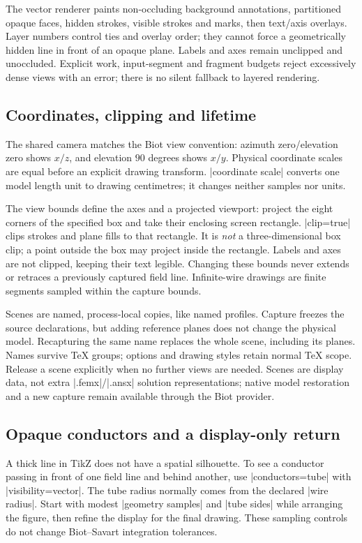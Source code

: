 The vector renderer paints non-occluding background annotations, partitioned
opaque faces, hidden strokes, visible strokes and marks, then text/axis overlays.
Layer numbers control ties and overlay order; they cannot force a geometrically
hidden line in front of an opaque plane. Labels and axes remain unclipped and
unoccluded. Explicit work, input-segment and fragment budgets reject excessively
dense views with an error; there is no silent fallback to layered rendering.

\subsection{Coordinates, clipping and lifetime}
The shared camera matches the Biot view convention: azimuth zero/elevation zero
shows $x/z$, and elevation $90$ degrees shows $x/y$. Physical coordinate scales
are equal before an explicit drawing transform. |coordinate scale| converts one
model length unit to drawing centimetres; it changes neither samples nor units.

The view bounds define the axes and a projected viewport: project the eight
corners of the specified box and take their enclosing screen rectangle.
|clip=true| clips strokes and plane fills to that rectangle. It is \emph{not}
a three-dimensional box clip; a point outside the box may project inside the
rectangle. Labels and axes are not clipped, keeping their text legible.
Changing these bounds never extends or retraces a previously captured field line.
Infinite-wire drawings are finite segments sampled within the capture bounds.

Scenes are named, process-local copies, like named profiles. Capture freezes the
source declarations, but adding reference planes does not change the physical
model. Recapturing the same name replaces the whole scene, including its planes.
Names survive TeX groups; options and drawing styles retain normal TeX scope.
Release a scene explicitly when no further views are needed. Scenes are display
data, not extra |.femx|/|.ansx| solution representations; native model restoration
and a new capture remain available through the Biot provider.

\subsection{Opaque conductors and a display-only return}
A thick line in TikZ does not have a spatial silhouette. To see a conductor
passing in front of one field line and behind another, use |conductors=tube|
with |visibility=vector|. The tube radius normally comes from the declared
|wire radius|. Start with modest |geometry samples| and |tube sides| while
arranging the figure, then refine the display for the final drawing. These
sampling controls do not change Biot--Savart integration tolerances.

